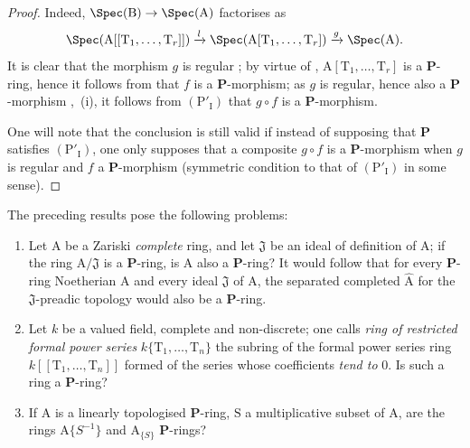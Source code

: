 \begin{proof}
Indeed, $\Spec(\mathrm{B})\to\Spec(\mathrm{A})$ factorises as
\[
  \Spec(\mathrm{A}[[\mathrm{T}_1,\ldots,\mathrm{T}_r]])\xrightarrow{l}\Spec(\mathrm{A}[\mathrm{T}_1,\ldots,\mathrm{T}_r])\xrightarrow{g}\Spec(\mathrm{A}).
\]
It is clear that the morphism $g$ is regular ; by virtue of , $\mathrm{A}[\mathrm{T}_1,\ldots,\mathrm{T}_r]$ is a $\boldsymbol{P}$-ring, hence it follows from  that $f$ is a $\boldsymbol{P}$-morphism; as $g$ is regular, hence also a $\boldsymbol{P}$-morphism ,~(i), it follows from $(\mathrm{P}'_\mathrm{I})$ that $g\circ f$ is a $\boldsymbol{P}$-morphism.

One will note that the conclusion is still valid if instead of supposing that $\boldsymbol{P}$ satisfies $(\mathrm{P}'_\mathrm{I})$, one only supposes that a composite $g\circ f$ is a $\boldsymbol{P}$-morphism when $g$ is regular and $f$ a $\boldsymbol{P}$-morphism (symmetric condition to that of $(\mathrm{P}'_\mathrm{I})$ in some sense).
\end{proof}

\begin{remark}[7.4.8]
\label{IV.7.4.8}
The preceding results pose the following problems:
\begin{enumerate}[label=\rm\Alph*)]
  \item Let $\mathrm{A}$ be a Zariski \emph{complete} ring, and let $\mathfrak{J}$ be an ideal of definition of $\mathrm{A}$; if the ring $\mathrm{A}/\mathfrak{J}$ is a $\boldsymbol{P}$-ring, is $\mathrm{A}$ also a $\boldsymbol{P}$-ring?
  It would follow that for every $\boldsymbol{P}$-ring Noetherian $\mathrm{A}$ and every ideal $\mathfrak{J}$ of $\mathrm{A}$, the separated completed $\widehat{\mathrm{A}}$ for the $\mathfrak{J}$-preadic topology would also be a $\boldsymbol{P}$-ring.
  \item Let $k$ be a valued field, complete and non-discrete; one calls \emph{ring of restricted formal power series} $k\{\mathrm{T}_1,\ldots,\mathrm{T}_n\}$ the subring of the formal power series ring $k[[\mathrm{T}_1,\ldots,\mathrm{T}_n]]$ formed of the series whose coefficients \emph{tend to} $0$.
  Is such a ring a $\boldsymbol{P}$-ring?
  \item If $\mathrm{A}$ is a linearly topologised $\boldsymbol{P}$-ring, $\mathrm{S}$ a multiplicative subset of $\mathrm{A}$, are the rings $\mathrm{A}\{S^{-1}\}$  and $\mathrm{A}_{\{S\}}$  $\boldsymbol{P}$-rings?
\end{enumerate}
\end{remark}


